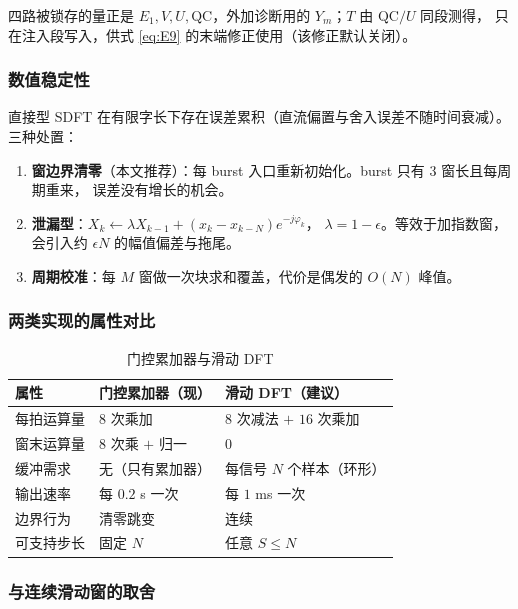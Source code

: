 \documentclass[11pt,a4paper]{ctexart}
\begin{document}
四路被锁存的量正是 $E_1,V,U,\mathrm{QC}$，外加诊断用的 $Y_m$；$T$ 由 $\mathrm{QC}/U$ 同段测得，
只在注入段写入，供式 \eqref{eq:E9} 的末端修正使用（该修正默认关闭）。

\subsubsection*{数值稳定性}

直接型 SDFT 在有限字长下存在误差累积（直流偏置与舍入误差不随时间衰减）。三种处置：

\begin{enumerate}
\item \textbf{窗边界清零}（本文推荐）：每 burst 入口重新初始化。burst 只有 $3$ 窗长且每周期重来，
误差没有增长的机会。
\item \textbf{泄漏型}：$X_k\leftarrow\lambda X_{k-1}+(x_k-x_{k-N})e^{-j\varphi_k}$，
$\lambda=1-\epsilon$。等效于加指数窗，会引入约 $\epsilon N$ 的幅值偏差与拖尾。
\item \textbf{周期校准}：每 $M$ 窗做一次块求和覆盖，代价是偶发的 $O(N)$ 峰值。
\end{enumerate}

\subsubsection*{两类实现的属性对比}

\begin{table}[H]
\centering
\caption{门控累加器与滑动 DFT}
\label{tab:sdft}
\begin{tabular}{lll}
\toprule
属性 & 门控累加器（现） & 滑动 DFT（建议）\\
\midrule
每拍运算量 & $8$ 次乘加 & $8$ 次减法 $+$ $16$ 次乘加\\
窗末运算量 & $8$ 次乘 $+$ 归一 & $0$\\
缓冲需求 & 无（只有累加器） & 每信号 $N$ 个样本（环形）\\
输出速率 & 每 $0.2$ s 一次 & 每 $1$ ms 一次\\
边界行为 & 清零跳变 & 连续\\
可支持步长 & 固定 $N$ & 任意 $S\le N$\\ 
\bottomrule
\end{tabular}
\end{table}

\subsubsection*{与连续滑动窗的取舍}
\end{document}
